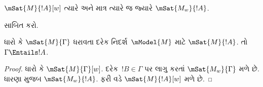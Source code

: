 \documentclass[../../../include/open-logic-section]{subfiles}
\begin{document}
\begin{prop}
  $\mSat{M}{!A}[w]$ ત્યારે અને માત્ર ત્યારે જ જ્યારે
  $\mSat{M_w}{!A}$.
\end{prop}

\begin{prob}
   સાબિત કરો.
\end{prob}

\begin{prop}
  ધારો કે $\mSat{M}{\Gamma}$ ધરાવતા દરેક નિદર્શ~$\mModel{M}$
  માટે $\mSat{M}{!A}$. તો $\Gamma \Entails !A$.
\end{prop}

\begin{proof}
  ધારો કે $\mSat{M}{\Gamma}[w]$. દરેક~$!B \in \Gamma$
  પર  લાગુ કરતાં $\mSat{M_w}{\Gamma}$
  મળે છે. ધારણા મુજબ $\mSat{M_w}{!A}$. ફરી
   વડે $\mSat{M}{!A}[w]$ મળે છે.
\end{proof}
\end{document}
